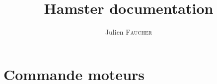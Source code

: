 \documentclass[a4paper,french]{report}
\author{Julien \textsc{Faucher}}
\title{Hamster documentation}
\begin{document}
\maketitle
\tableofcontents 
\chapter{Commande moteurs}

\end{document}
